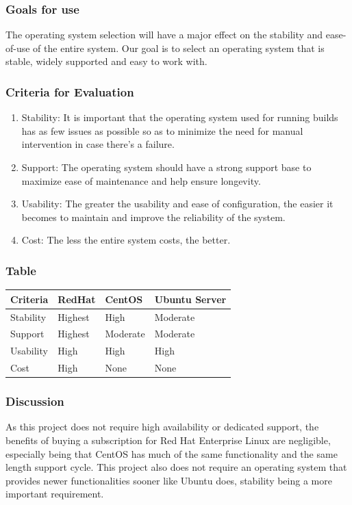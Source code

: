 \documentclass[10pt,letterpaper,onecolumn,draftclsnofoot]{IEEEtran}
\begin{document}
\subsubsection{Goals for use}
The operating system  selection will have a major effect on the stability and ease-of-use of the entire system. Our goal is to select an operating system that is stable, widely supported and easy to work with.
\subsubsection{Criteria for Evaluation}
\begin{enumerate}
  \item Stability: It is important that the operating system used for running builds has as few issues as possible so as to minimize the need for manual intervention in case there's a failure.
  \item Support: The operating system should have a strong support base to maximize ease of maintenance and help ensure longevity.
  \item Usability: The greater the usability and ease of configuration, the easier it becomes to maintain and improve the reliability of the system.
  \item Cost: The less the entire system costs, the better.
\end{enumerate}
\subsubsection{Table}
\begin{center}
  \begin{tabular}{llll}
    Criteria & RedHat & CentOS & Ubuntu Server \\ \midrule
    Stability       & Highest & High & Moderate \\ \midrule
    Support           & Highest & Moderate & Moderate \\ \midrule
    Usability       & High & High & High \\ \midrule
    Cost       & High & None & None \\ \bottomrule
  \end{tabular}
\end{center}
\subsubsection{Discussion}
As this project does not require high availability or dedicated support, the benefits of buying a subscription for Red Hat Enterprise Linux are negligible, especially being that CentOS has much of the same functionality and the same length support cycle. This project also does not require an operating system that provides newer functionalities sooner like Ubuntu does, stability being a more important requirement.
\end{document}
